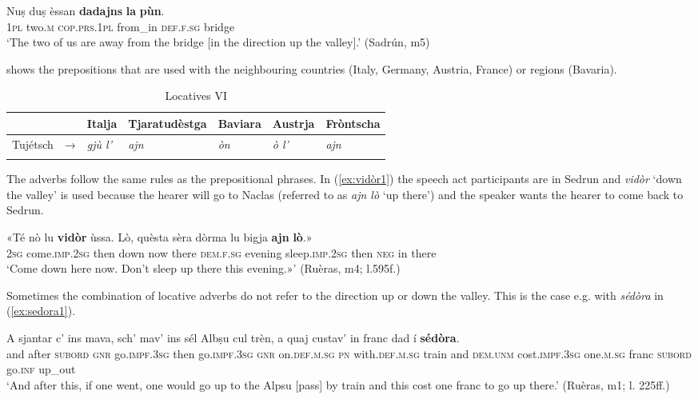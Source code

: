 \ea
\label{ex:dadajnspun}
\gll Nuṣ duṣ èssan \textbf{dadajns} \textbf{la} \textbf{pùn}.\\
\textsc{1pl} two.\textsc{m} \textsc{cop.prs.1pl} from\_in \textsc{def.f.sg} bridge\\
\glt `The two of us are away from the bridge [in the direction up the valley].' (Sadrún, m5)
\z


 shows the prepositions that are used with the neighbouring countries (Italy, Germany, Austria, France) or regions (Bavaria).

\begin{table}
	\caption{Locatives VI}
	\label{loc6}
	\begin{tabular}{lllllll}
		\lsptoprule
		& & Italja & Tjaratudèstga  & Baviara & Austrja & Fròntscha\\ 
		\midrule
		Tujétsch  &    →& \textit{gjù l'} &  \textit{ajn}   &  \textit{òn} & \textit{ò l'} & \textit{ajn}\\
		\lspbottomrule
	\end{tabular}
\end{table}

The adverbs follow the same rules as the prepositional phrases. In (\ref{ex:vidòr1}) the speech act participants are in Sedrun and \textit{vidòr} `down the valley' is used because the hearer will go to Naclas (referred to as \textit{ajn lò} `up there') and the speaker wants the hearer to come back to Sedrun.

\ea
\label{ex:vidòr1}
\gll «Té nò lu \textbf{vidòr} ùssa. Lò, quèsta sèra dòrma lu bigja \textbf{ajn} \textbf{lò}.»\\
\textsc{2sg} come.\textsc{imp.2sg} then down now there  \textsc{dem.f.sg} evening sleep.\textsc{imp.2sg} then \textsc{neg} in there\\
\glt `Come down here now. Don’t sleep up there this evening.»' (Ruèras, m4; l.595f.)
\z

Sometimes the combination of locative adverbs do not refer to the direction up or down the valley. This is the case e.g. with \textit{sédòra} in (\ref{ex:sedora1}).

\ea
\label{ex:sedora1}
\gll    A sjantar c’ ins mava, sch’ mav’ ins sél Albṣu cul trèn, a quaj custav’ in franc dad í \textbf{sédòra}.\\
and after \textsc{subord} \textsc{gnr}  go.\textsc{impf.3sg} then go.\textsc{impf.3sg} \textsc{gnr} on.\textsc{def.m.sg} \textsc{pn} with.\textsc{def.m.sg} train and \textsc{dem.unm} cost.\textsc{impf.3sg} one.\textsc{m.sg}  franc \textsc{subord} go.\textsc{inf} up\_out \\
\glt `And after this, if one went, one would go up to the Alpsu [pass] by train and this cost one franc to go up there.' (Ruèras, m1; l. 225ff.)
\z


